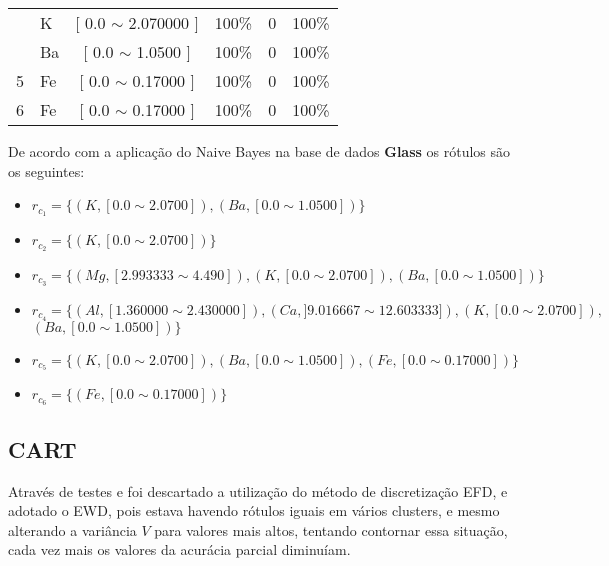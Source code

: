 \begin{table}[!h]
{\begin{tabular}{llcrcc}
                                            & K     & [ 0.0 $\sim$  2.070000     ]       & 100\%                               & 0 & 100\%\\  
                                            & Ba    & [ 0.0 $\sim$  1.0500     ]       & 100\%                               & 0 & 100\% \\   
\multirow{-3}{*}{5}                         & Fe    & [ 0.0 $\sim$  0.17000     ]       & 100\%                               & 0 & 100\% \\  \hline
6                                            & Fe    & [ 0.0 $\sim$  0.17000     ]       & 100\%                               & 0 & 100\% \\  \hline

\hline

\end{tabular}
}
\end{table}



De acordo com a aplicação do Naive Bayes na base de dados \textbf{Glass} os rótulos são os seguintes:
\begin{itemize}[noitemsep]
 \item ${r_{c_1}=\{ (K,[ 0.0 \sim  2.0700 ] ), (Ba,[ 0.0 \sim 1.0500 ] ) \} }$  
 \item ${r_{c_2}=\{ (K,[ 0.0 \sim  2.0700 ] ) \} }$
 \item ${r_{c_3}=\{ (Mg, [ 2.993333 \sim  4.490]), (K,[ 0.0 \sim  2.0700 ] ), (Ba,[ 0.0 \sim 1.0500 ] )  \} }$  
 \item ${r_{c_4}=\{(Al,[ 1.360000 \sim  2.430000 ] ), (Ca,] 9.016667 \sim  12.603333] ), (K,[  0.0 \sim  2.0700 ] ),}$  
${ (Ba,[ 0.0 \sim 1.0500 ] ) \} }$
 \item ${r_{c_5}=\{ (K,[ 0.0 \sim  2.0700 ] ), (Ba,[ 0.0 \sim 1.0500 ] ), (Fe,[ 0.0 \sim 0.17000] ) \} }$
 \item ${r_{c_6}=\{ (Fe,[ 0.0 \sim 0.17000] ) \} }$
\end{itemize}


\subsection{CART} \label{cap:resultados:ssec:glass:cart}


Através de testes e foi descartado a utilização do método de discretização EFD, e adotado o EWD, pois estava havendo  rótulos iguais em vários clusters, e mesmo alterando a variância ${V}$ para valores mais altos, tentando contornar essa situação, cada vez mais os valores da acurácia parcial diminuíam. 

